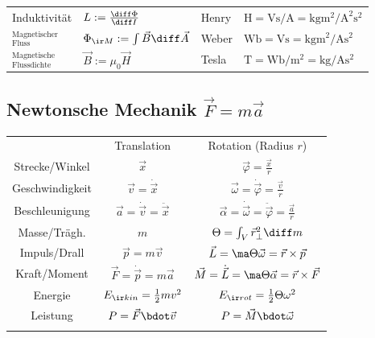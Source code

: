 \documentclass[fs, german]{latex4ei_fs}
\begin{document}
\begin{sectionbox}
\begin{tabular}{llll}
		Induktivität & $L := \frac{\diff \Phi}{\diff I}$ & Henry & $\si{\henry} = \si{\volt\second \per\ampere} = \si{\kilogram\meter  \squared \per \ampere  \squared \second  \squared}$\\
		${}^{\text{Magnetischer}}_{\textstyle \text{Fluss}}$ & $\Phi_{\ir M} := \int \vec B \diff \vec A$ & Weber & $\si{\weber} = \si{\volt\second} = \si{\kilogram\meter \squared \per \ampere\second \squared}$\\[0.2em]
		${}^{\text{Magnetische}}_{\textstyle \text{Flussdichte}}$ & $\vec B := \mu_0 \vec H$ & Tesla & $\si{\tesla} = \si{\weber \per \meter  \squared} = \si{\kilogram \per \ampere\second \squared}$\\
\end{tabular}
\end{sectionbox}
\begin{sectionbox}
	\subsection{Newtonsche Mechanik $\vec F=m \vec a $}
	\begin{tabular}{ccc} \ctrule
				& \large Translation & {\large Rotation} (Radius $r$) \\ \cmrule
		Strecke/Winkel & \large $\vec x$ & \large $\vec \varphi =  \frac{\vec x}{r}$\\[0.2em]
		Geschwindigkeit & \large $\vec v = \dot{\vec x}$ & \large $\vec \omega = \dot{\vec \varphi} = \frac{\vec v}{r}$ \\[0.2em]
		Beschleunigung & \large $\vec a = \dot{\vec v} = \ddot{\vec x}$ & \large $\vec \alpha = \dot{\vec \omega} = \ddot{\vec \varphi} = \frac{\vec a}{r}$ \\[0.2em]
		Masse/Trägh. & \large $m$ & \large $\Theta = \int_V \vec r^2_\perp \diff m$ \\[0.2em]
		Impuls/Drall & \large $\vec p =m \vec v$ & \large $\vec L = \ma \Theta \vec \omega = \vec r \times \vec p$ \\[0.2em]
		Kraft/Moment & \large $\vec F = \dot{\vec p} = m \vec a$ &  \large $\vec M = \dot{\vec L} = \ma \Theta \vec \alpha = \vec r \times \vec F$ \\[0.2em]
		Energie & \large $E_{\ir kin}=\frac12mv^2$ & \large $E_{\ir rot}=\frac12 \Theta \omega ^2$\\[0.2em]
		Leistung & \large $P = \vec F \bdot \vec v$ & \large $P = \vec M \bdot \vec \omega$\\ \cbrule
	\end{tabular}
\end{sectionbox}
\end{document}
